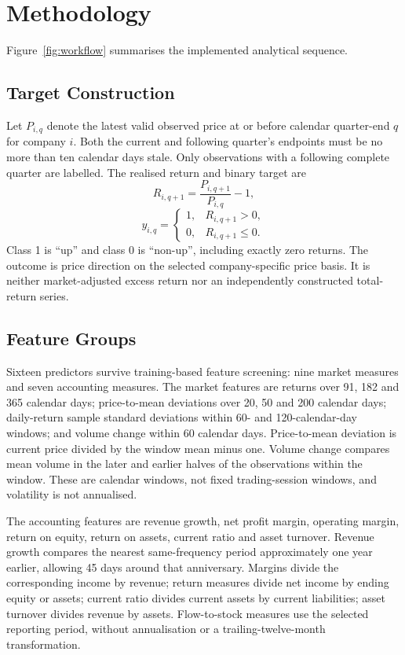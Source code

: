 \documentclass[letterpaper,10pt,conference]{ieeeconf}
\begin{document}
\section{Methodology}
Figure~\ref{fig:workflow} summarises the implemented analytical sequence.

\subsection{Target Construction}
Let $P_{i,q}$ denote the latest valid observed price at or before calendar quarter-end $q$ for company $i$. Both the current and following quarter's endpoints must be no more than ten calendar days stale. Only observations with a following complete quarter are labelled. The realised return and binary target are
\begin{equation}
R_{i,q+1}=\frac{P_{i,q+1}}{P_{i,q}}-1,
\end{equation}
\begin{equation}
y_{i,q}=\begin{cases}1,&R_{i,q+1}>0,\\0,&R_{i,q+1}\leq0.\end{cases}
\end{equation}
Class 1 is ``up'' and class 0 is ``non-up'', including exactly zero returns. The outcome is price direction on the selected company-specific price basis. It is neither market-adjusted excess return nor an independently constructed total-return series.

\subsection{Feature Groups}
Sixteen predictors survive training-based feature screening: nine market measures and seven accounting measures. The market features are returns over 91, 182 and 365 calendar days; price-to-mean deviations over 20, 50 and 200 calendar days; daily-return sample standard deviations within 60- and 120-calendar-day windows; and volume change within 60 calendar days. Price-to-mean deviation is current price divided by the window mean minus one. Volume change compares mean volume in the later and earlier halves of the observations within the window. These are calendar windows, not fixed trading-session windows, and volatility is not annualised.

The accounting features are revenue growth, net profit margin, operating margin, return on equity, return on assets, current ratio and asset turnover. Revenue growth compares the nearest same-frequency period approximately one year earlier, allowing 45 days around that anniversary. Margins divide the corresponding income by revenue; return measures divide net income by ending equity or assets; current ratio divides current assets by current liabilities; asset turnover divides revenue by assets. Flow-to-stock measures use the selected reporting period, without annualisation or a trailing-twelve-month transformation.
\end{document}
